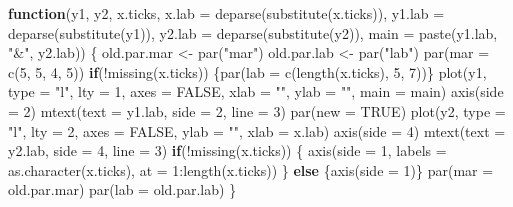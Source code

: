 \documentclass[
  12pt,
  a4paper]{book}
\newenvironment{Shaded}{\begin{snugshade}}{\end{snugshade}}
\newcommand{\AttributeTok}[1]{\textcolor[rgb]{0.77,0.63,0.00}{#1}}
\newcommand{\ConstantTok}[1]{\textcolor[rgb]{0.00,0.00,0.00}{#1}}
\newcommand{\ControlFlowTok}[1]{\textcolor[rgb]{0.13,0.29,0.53}{\textbf{#1}}}
\newcommand{\DecValTok}[1]{\textcolor[rgb]{0.00,0.00,0.81}{#1}}
\newcommand{\FunctionTok}[1]{\textcolor[rgb]{0.00,0.00,0.00}{#1}}
\newcommand{\NormalTok}[1]{#1}
\newcommand{\OtherTok}[1]{\textcolor[rgb]{0.56,0.35,0.01}{#1}}
\newcommand{\SpecialCharTok}[1]{\textcolor[rgb]{0.00,0.00,0.00}{#1}}
\newcommand{\StringTok}[1]{\textcolor[rgb]{0.31,0.60,0.02}{#1}}
\begin{document}
\begin{Shaded}
\begin{Highlighting}[]
\ControlFlowTok{function}\NormalTok{(y1,}
\NormalTok{         y2,}
\NormalTok{         x.ticks,}
         \AttributeTok{x.lab =} \FunctionTok{deparse}\NormalTok{(}\FunctionTok{substitute}\NormalTok{(x.ticks)),}
         \AttributeTok{y1.lab =} \FunctionTok{deparse}\NormalTok{(}\FunctionTok{substitute}\NormalTok{(y1)),}
         \AttributeTok{y2.lab =} \FunctionTok{deparse}\NormalTok{(}\FunctionTok{substitute}\NormalTok{(y2)),}
         \AttributeTok{main =} \FunctionTok{paste}\NormalTok{(y1.lab, }\StringTok{"\&"}\NormalTok{, y2.lab)) \{}
\NormalTok{  old.par.mar }\OtherTok{\textless{}{-}} \FunctionTok{par}\NormalTok{(}\StringTok{"mar"}\NormalTok{)}
\NormalTok{  old.par.lab }\OtherTok{\textless{}{-}} \FunctionTok{par}\NormalTok{(}\StringTok{"lab"}\NormalTok{)}
  \FunctionTok{par}\NormalTok{(}\AttributeTok{mar =} \FunctionTok{c}\NormalTok{(}\DecValTok{5}\NormalTok{, }\DecValTok{5}\NormalTok{, }\DecValTok{4}\NormalTok{, }\DecValTok{5}\NormalTok{))}
  \ControlFlowTok{if}\NormalTok{(}\SpecialCharTok{!}\FunctionTok{missing}\NormalTok{(x.ticks)) \{}\FunctionTok{par}\NormalTok{(}\AttributeTok{lab =} \FunctionTok{c}\NormalTok{(}\FunctionTok{length}\NormalTok{(x.ticks), }\DecValTok{5}\NormalTok{, }\DecValTok{7}\NormalTok{))\}}
  \FunctionTok{plot}\NormalTok{(y1, }\AttributeTok{type =} \StringTok{"l"}\NormalTok{, }\AttributeTok{lty =} \DecValTok{1}\NormalTok{, }\AttributeTok{axes =} \ConstantTok{FALSE}\NormalTok{,}
       \AttributeTok{xlab =} \StringTok{""}\NormalTok{, }\AttributeTok{ylab =} \StringTok{""}\NormalTok{, }\AttributeTok{main =}\NormalTok{ main)}
  \FunctionTok{axis}\NormalTok{(}\AttributeTok{side =} \DecValTok{2}\NormalTok{)}
  \FunctionTok{mtext}\NormalTok{(}\AttributeTok{text =}\NormalTok{ y1.lab, }\AttributeTok{side =} \DecValTok{2}\NormalTok{, }\AttributeTok{line =} \DecValTok{3}\NormalTok{)}
  \FunctionTok{par}\NormalTok{(}\AttributeTok{new =} \ConstantTok{TRUE}\NormalTok{)}
  \FunctionTok{plot}\NormalTok{(y2, }\AttributeTok{type =} \StringTok{"l"}\NormalTok{, }\AttributeTok{lty =} \DecValTok{2}\NormalTok{, }\AttributeTok{axes =} \ConstantTok{FALSE}\NormalTok{,}
       \AttributeTok{ylab =} \StringTok{""}\NormalTok{, }\AttributeTok{xlab =}\NormalTok{ x.lab)}
  \FunctionTok{axis}\NormalTok{(}\AttributeTok{side =} \DecValTok{4}\NormalTok{)}
  \FunctionTok{mtext}\NormalTok{(}\AttributeTok{text =}\NormalTok{ y2.lab, }\AttributeTok{side =} \DecValTok{4}\NormalTok{, }\AttributeTok{line =} \DecValTok{3}\NormalTok{)}
  \ControlFlowTok{if}\NormalTok{(}\SpecialCharTok{!}\FunctionTok{missing}\NormalTok{(x.ticks)) \{}
    \FunctionTok{axis}\NormalTok{(}\AttributeTok{side =} \DecValTok{1}\NormalTok{, }\AttributeTok{labels =} \FunctionTok{as.character}\NormalTok{(x.ticks),}
         \AttributeTok{at =} \DecValTok{1}\SpecialCharTok{:}\FunctionTok{length}\NormalTok{(x.ticks))}
\NormalTok{  \} }\ControlFlowTok{else}\NormalTok{ \{}\FunctionTok{axis}\NormalTok{(}\AttributeTok{side =} \DecValTok{1}\NormalTok{)\}}
  \FunctionTok{par}\NormalTok{(}\AttributeTok{mar =}\NormalTok{ old.par.mar)}
  \FunctionTok{par}\NormalTok{(}\AttributeTok{lab =}\NormalTok{ old.par.lab)}
\NormalTok{\}}
\end{Highlighting}
\end{Shaded}
\end{document}
